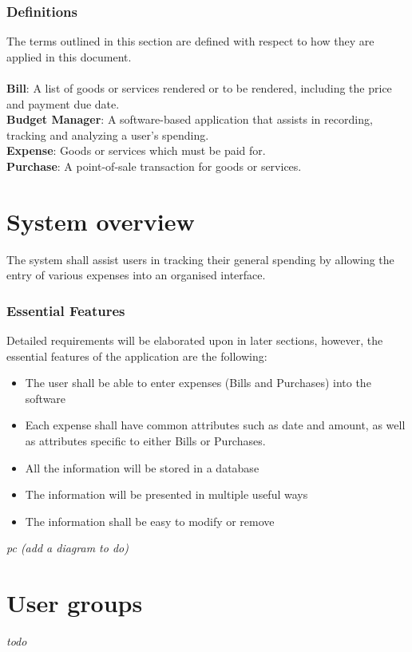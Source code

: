\documentclass[12pt]{article}
\begin{document}
\subsubsection{Definitions}
The terms outlined in this section are defined with respect to how they are applied in this document.\\
\\
\textbf{Bill}: A list of goods or services rendered or to be rendered, including the price and payment due date.\\
\textbf{Budget Manager}: A software-based application that assists in recording, tracking and analyzing a user's spending.\\
\textbf{Expense}: Goods or services which must be paid for.\\
\textbf{Purchase}: A point-of-sale transaction for goods or services.
\section{System overview} \label{sysOvr}
The system shall assist users in tracking their general spending by allowing the entry of various expenses into an organised interface.
\subsubsection{Essential Features}
Detailed requirements will be elaborated upon in later sections, however, the essential features of the application are the following:
\begin{itemize}
\item The user shall be able to enter expenses (Bills and Purchases) into the software
\item Each expense shall have common attributes such as date and amount, as well as attributes specific to either Bills or Purchases.
\item All the information will be stored in a database
\item The information will be presented in multiple useful ways
\item The information shall be easy to modify or remove
\end{itemize}
\emph{pc  (add a diagram to do)}
\section{User groups} \label{userGrps}
\emph{todo}
\end{document}
